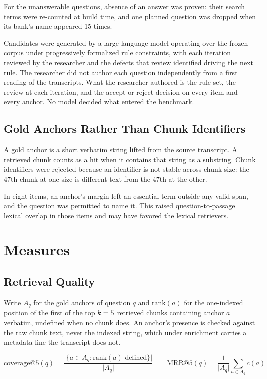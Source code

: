 For the unanswerable questions, absence of an answer was proven:
their search terms were re-counted at build time, and one planned question was
dropped when its bank's name appeared 15 times.

Candidates were generated by a large language model
operating over the frozen corpus under progressively formalized rule
constraints, with each iteration reviewed by the researcher and the defects that
review identified driving the next rule. The researcher did not author each
question independently from a first reading of the transcripts. What the
researcher authored is the rule set, the review at each iteration, and the
accept-or-reject decision on every item and every anchor. No model decided what
entered the benchmark.

\subsection{Gold Anchors Rather Than Chunk Identifiers}

A gold anchor is a short verbatim string lifted from the source transcript. A
retrieved chunk counts as a hit when it contains that string as a substring.
Chunk identifiers were rejected because an identifier is not stable across chunk
size: the 47th chunk at one size is different text from the 47th at the other.

In eight items, an anchor's margin left an essential term outside any valid
span, and the question was permitted to name it. This raised question-to-passage
lexical overlap in those items and may have favored the lexical retrievers.

\section{Measures}

\subsection{Retrieval Quality}

Write $A_q$ for the gold anchors of question $q$ and $\mathrm{rank}(a)$ for the
one-indexed position of the first of the top $k = 5{}$ retrieved
chunks containing anchor $a$ verbatim, undefined when no chunk does. An anchor's
presence is checked against the raw chunk text, never the indexed string, which
under enrichment carries a metadata line the transcript does not.

\[
  \mathrm{coverage@5}(q)
  = \frac{\bigl|\{ a \in A_q : \mathrm{rank}(a) \text{ defined} \}\bigr|}
         {\lvert A_q \rvert}
  \qquad
  \mathrm{MRR@5}(q) = \frac{1}{\lvert A_q \rvert} \sum_{a \in A_q} c(a)
\]

